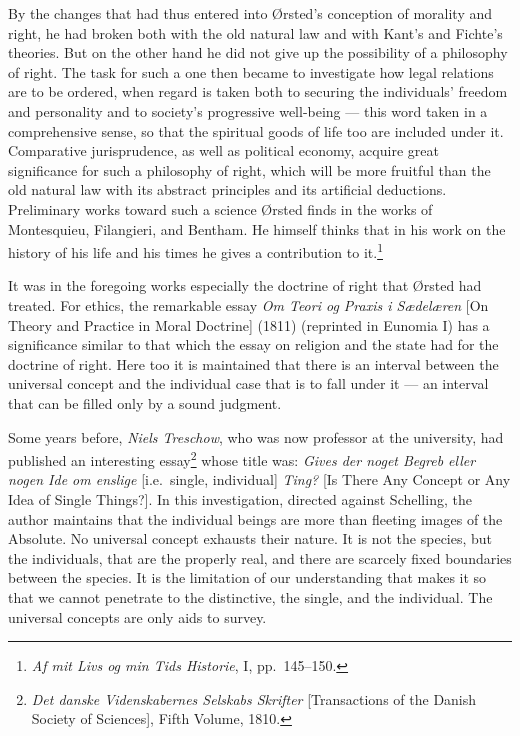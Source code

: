 \documentclass[12pt,a4paper]{book}
\newcommand{\opage}[1]{\marginnote{\footnotesize\textit{[#1]}}}
\begin{document}
By the changes that had thus entered into Ørsted's conception of morality and right, he
had broken both with the old natural law and with Kant's and Fichte's theories. But on the
other hand he did not give up the possibility of a philosophy of right. The task for such
a one then became to investigate how legal relations are to be ordered, when regard is
taken both to securing the individuals' freedom and personality and to society's
progressive well-being --- this word taken in a comprehensive sense, so that the spiritual
goods of life too are included under it. Comparative jurisprudence, as well as political
economy, acquire great significance for such a philosophy of right, which will be more
fruitful than the old natural law with its abstract principles and its artificial
deductions. Preliminary works toward such a science Ørsted finds in the works of
Montesquieu, Filangieri, and Bentham. He himself thinks that in his work on the history of
his life and his times he gives a contribution to it.\footnote{\emph{Af mit Livs og min
Tids Historie}, I, pp.~145--150.}

It was in the foregoing works especially the doctrine of right that Ørsted had treated. For
ethics, the remarkable essay \emph{Om Teori og Praxis i Sædelæren} [On Theory and Practice
in Moral Doctrine] (1811) (reprinted in Eunomia I) has a significance similar to that which
the essay on religion and the state had for the doctrine of right. Here too it is
maintained \opage{78}that there is an interval between the universal concept and the individual case
that is to fall under it --- an interval that can be filled only by a sound judgment.

Some years before, \emph{Niels Treschow}, who was now professor at the university, had published
an interesting essay\footnote{\emph{Det danske Videnskabernes Selskabs Skrifter}
[Transactions of the Danish Society of Sciences], Fifth Volume, 1810.} whose title was:
\emph{Gives der noget Begreb eller nogen Ide om enslige} [i.e.\ single, individual]
\emph{Ting?} [Is There Any Concept or Any Idea of Single Things?]. In this investigation,
directed against Schelling, the author maintains that the individual beings are more than
fleeting images of the Absolute. No universal concept exhausts their nature. It is not the
species, but the individuals, that are the properly real, and there are scarcely fixed
boundaries between the species. It is the limitation of our understanding that makes it so
that we cannot penetrate to the distinctive, the single, and the individual. The universal
concepts are only aids to survey.
\end{document}

